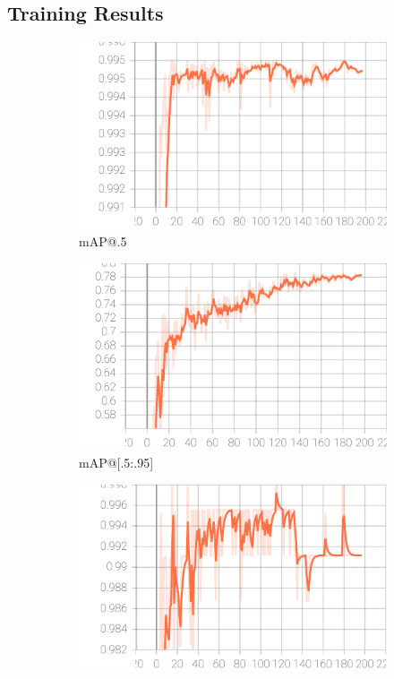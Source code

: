 \documentclass[10pt,conference,compsocconf]{IEEEtran}
\begin{document}
\begin{appendices}
\section{Training Results} \label{sec:TrainingResults}
\begin{figure}[!ht]
  \centering
  \begin{subfigure}{0.24\textwidth}
    \includegraphics[width=\linewidth]{Image/metrics_mAP_0.5.pdf}
    \caption{mAP@.5}
  \end{subfigure}
  \hfil
  \begin{subfigure}{0.24\textwidth}
    \includegraphics[width=\linewidth]{Image/metrics_mAP_0.5_0.95.pdf}
    \caption{mAP@[.5:.95]}
  \end{subfigure}
  \hfil
  \begin{subfigure}{0.24\textwidth}
    \includegraphics[width=\linewidth]{Image/metrics_precision.pdf}

\end{subfigure}
\end{figure}
\end{appendices}
\end{document}
